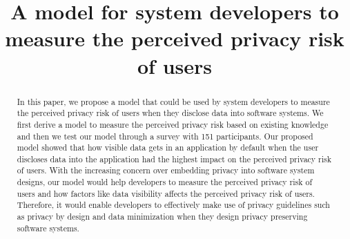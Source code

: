 \documentclass[10pt]{article}
\title{A model for system developers to measure the perceived privacy risk of users}
\date{}
\begin{document}
\maketitle
\begin{abstract}
In this paper, we propose a model that could be used by system developers to measure the perceived privacy risk of users when they disclose data into software systems. We first derive a model to measure the perceived privacy risk based on existing knowledge and then we test our model through a survey with 151 participants. Our proposed model showed that how visible data gets in an application by default when the user discloses data into the application had the highest impact on the perceived privacy risk of users.  With the increasing concern over embedding privacy into software system designs, our model would help developers to measure the perceived privacy risk of users and how factors like data visibility affects the perceived privacy risk of users. Therefore, it would enable developers to effectively make use of privacy guidelines such as privacy by design and data minimization when they design privacy preserving software systems.

\end{abstract}
\end{document}
